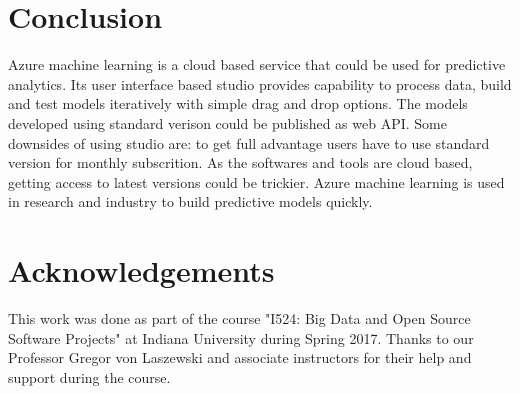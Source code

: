 \documentclass[9pt,twocolumn,twoside]{styles/osajnl}
\begin{document}
\section{Conclusion}

Azure machine learning is a cloud based service that could be used for
predictive analytics. Its user interface based studio provides
capability to process data, build and test models iteratively with
simple drag and drop options. The models developed using standard
verison could be published as web API. Some downsides of using studio
are: to get full advantage users have to use standard version for
monthly subscrition. As the softwares and tools are cloud based,
getting access to latest versions could be trickier. Azure machine
learning is used in research and industry to build predictive models
quickly.


\section*{Acknowledgements}

This work was done as part of the course "I524: Big Data and Open
Source Software Projects" at Indiana University during Spring
2017. Thanks to our Professor Gregor von Laszewski and associate
instructors for their help and support during the course. 


\end{document}
